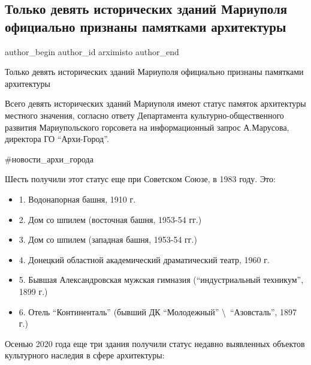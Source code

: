  
 
 
 
 

\subsection{Только девять исторических зданий Мариуполя официально признаны памятками архитектуры}
\label{sec:05_02_2021.fb.arximisto.1.devjat_istor_zdanij_pamjatki_arhitektury}

\ifcmt
 author_begin
   author_id arximisto
 author_end
\fi

Только девять исторических зданий Мариуполя официально признаны памятками архитектуры

Всего девять исторических зданий Мариуполя имеют статус памяток архитектуры
местного значения, согласно ответу Департамента культурно-общественного
развития Мариупольского горсовета на информационный запрос А.Марусова,
директора ГО \enquote{Архи-Город}.

\#новости\_архи\_города

Шесть получили этот статус еще при Советском Союзе, в 1983 году. Это:

\begin{itemize}
  \item 1. Водонапорная башня, 1910 г.
  \item 2. Дом со шпилем (восточная башня, 1953-54 гг.)
  \item 3. Дом со шпилем (западная башня, 1953-54 гг.)
  \item 4. Донецкий областной академический драматический театр, 1960 г.
  \item 5. Бывшая Александровская мужская гимназия (\enquote{индустриальный техникум}, 1899 г.)
  \item 6. Отель \enquote{Континенталь} (бывший ДК \enquote{Молодежный} \textbackslash~\enquote{Азовсталь}, 1897 г.)
\end{itemize}

Осенью 2020 года еще три здания получили статус недавно выявленных объектов культурного наследия в сфере архитектуры:

